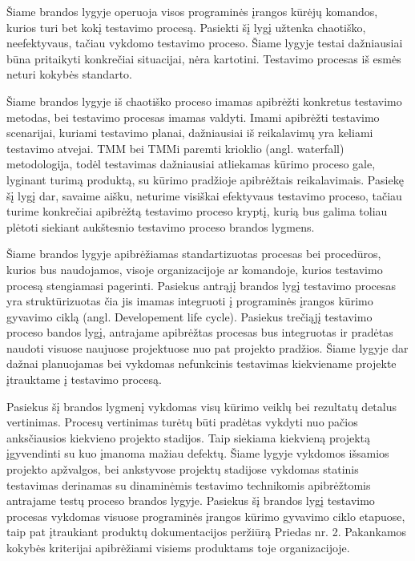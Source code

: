 \documentclass{VUMIFPSkursinis}
\begin{document}
Šiame brandos lygyje operuoja visos programinės įrangos kūrėjų komandos, kurios turi bet kokį testavimo procesą. Pasiekti šį lygį užtenka chaotiško, neefektyvaus, tačiau vykdomo testavimo proceso. Šiame lygyje testai dažniausiai būna pritaikyti konkrečiai situacijai, nėra kartotini. Testavimo procesas iš esmės neturi kokybės standarto.

Šiame brandos lygyje iš chaotiško proceso imamas apibrėžti konkretus testavimo metodas, bei testavimo procesas imamas valdyti. Imami apibrėžti testavimo scenarijai, kuriami testavimo planai, dažniausiai iš reikalavimų yra keliami testavimo atvejai. TMM bei TMMi paremti krioklio (angl. waterfall) metodologija, todėl testavimas dažniausiai atliekamas kūrimo proceso gale, lyginant turimą produktą, su kūrimo pradžioje apibrėžtais reikalavimais. Pasiekę šį lygį dar, savaime aišku, neturime visiškai efektyvaus testavimo proceso, tačiau turime konkrečiai apibrėžtą testavimo proceso kryptį, kurią bus galima toliau plėtoti siekiant aukštesnio testavimo proceso brandos lygmens.

Šiame brandos lygyje apibrėžiamas standartizuotas procesas bei procedūros, kurios bus naudojamos, visoje organizacijoje ar komandoje, kurios testavimo procesą stengiamasi pagerinti. Pasiekus antrąjį brandos lygį testavimo procesas yra struktūrizuotas čia jis imamas integruoti į programinės įrangos kūrimo gyvavimo ciklą (angl. Developement life cycle). Pasiekus trečiąjį testavimo proceso bandos lygį, antrajame apibrėžtas procesas bus integruotas ir pradėtas naudoti visuose naujuose projektuose nuo pat projekto pradžios. Šiame lygyje dar dažnai planuojamas bei vykdomas nefunkcinis testavimas kiekviename projekte įtrauktame į testavimo procesą.

Pasiekus šį brandos lygmenį vykdomas visų kūrimo veiklų bei rezultatų detalus vertinimas. Procesų vertinimas turėtų būti pradėtas vykdyti nuo pačios anksčiausios kiekvieno projekto stadijos. Taip siekiama kiekvieną projektą įgyvendinti su kuo įmanoma mažiau defektų. Šiame lygyje vykdomos išsamios projekto apžvalgos, bei ankstyvose projektų stadijose vykdomas statinis testavimas derinamas su dinaminėmis testavimo technikomis apibrėžtomis antrajame testų proceso brandos lygyje. Pasiekus šį brandos lygį testavimo procesas vykdomas visuose programinės įrangos kūrimo gyvavimo ciklo etapuose, taip pat įtraukiant produktų dokumentacijos peržiūrą Priedas nr. 2. Pakankamos kokybės kriterijai apibrėžiami visiems produktams toje organizacijoje.
\end{document}
